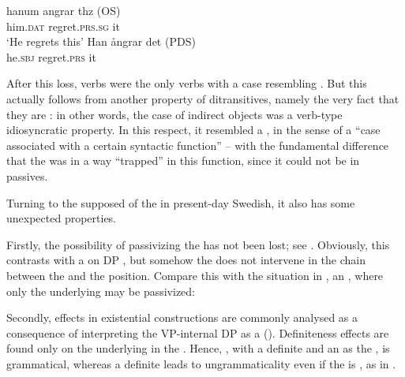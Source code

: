 \documentclass[output=paper]{langscibook}
\begin{document}
\ea%
    \label{ex:falk:5}
\ea
\gll hanum    angrar        thz    (OS)\\
      him.\textsc{dat} regret.\textsc{prs.sg}  it\\
\glt ‘He regrets this’
\ex
\gll Han    ångrar    det     (PDS)\\
      he.\textsc{sbj}  regret.\textsc{prs}  it\\
\z
\z

\begin{sloppypar}
After this loss,  verbs were the only verbs with a case resembling . But this actually follows from another property of ditransitives, namely the very fact that they are : in other words, the case of indirect objects was a verb-type idiosyncratic property. In this respect, it resembled a , in the sense of a “case associated with a certain syntactic function” – with the fundamental difference that the  was in a way “trapped” in this function, since it could not be  in passives.
\end{sloppypar}


Turning to the supposed  of the  in present-day Swedish, it also has some unexpected properties. 



Firstly, the possibility of passivizing the  has not been lost; see . Obviously, this contrasts with a  on DP , but somehow the  does not intervene in the chain between the  and the  position. Compare this with the situation in , an , where only the underlying  may be passivized:


\ea%
    \label{ex:falk:6}
\z
\z


Secondly,  effects in existential constructions are commonly analysed as a consequence of interpreting the VP-internal DP as a  (). Definiteness effects are found only on the underlying  in the . Hence, , with a definite  and an   as the , is grammatical, whereas a definite  leads to ungrammaticality even if the  is , as in .
\end{document}
